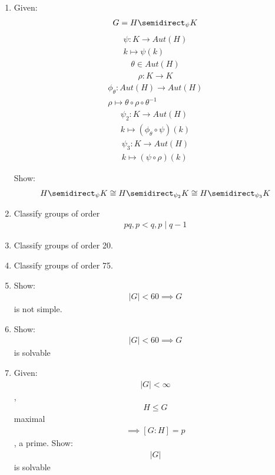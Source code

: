 \begin{enumerate}
\def\labelenumi{\arabic{enumi}.}
\item
  Given: \begin{align*}
  G = H \semidirect_\psi K\end{align*}
   \begin{align*}
  \psi: K \rightarrow Aut(H) \\ k \mapsto \psi(k)\end{align*}
   \begin{align*}
  \theta \in Aut(H)\end{align*}
   \begin{align*}
  \rho: K \rightarrow K\end{align*}
   \begin{align*}
  \phi_\theta: Aut(H) \rightarrow Aut(H) \\ \rho \mapsto \theta \circ \rho \circ \theta^{-1}\end{align*}
   \begin{align*}
  \psi_2: K \rightarrow Aut(H) \\ k \mapsto (\phi_\theta \circ \psi)(k)\end{align*}
   \begin{align*}
  \psi_3: K \rightarrow Aut(H) \\ k \mapsto (\psi \circ \rho)(k)\end{align*}

  Show: \begin{align*}
  H \semidirect_\psi K \cong H \semidirect_{\psi_2} K \cong H \semidirect_{\psi_3} K\end{align*}
\item
  Classify groups of order \begin{align*}
  pq, p < q, p \mid q-1\end{align*}
\item
  Classify groups of order 20.
\item
  Classify groups of order 75.
\item
  Show: \begin{align*}
  |G| < 60 \implies G\end{align*}
   is not simple.
\item
  Show: \begin{align*}
  |G| < 60 \implies G\end{align*}
   is solvable
\item
  Given: \begin{align*}
  |G| < \infty\end{align*}
  , \begin{align*}
  H \leq G\end{align*}
   maximal \begin{align*}
  \implies [G:H] = p\end{align*}
  , a prime. Show: \begin{align*}
  |G|\end{align*}
   is solvable


\end{enumerate}
